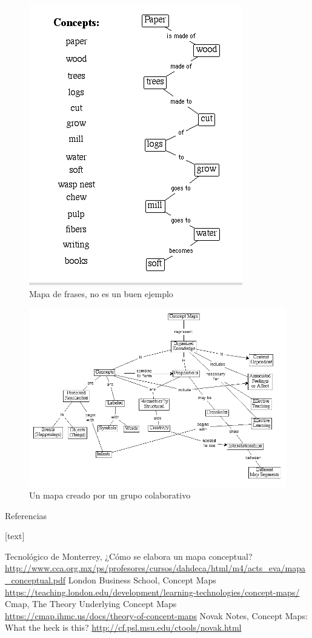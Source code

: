 \documentclass[
	11pt, %
]{beamer}
\begin{document}
\begin{frame}
  \begin{figure}[h]
    \includegraphics[width=0.5\linewidth]{paper.png}
    \caption{Mapa de frases, no es un buen ejemplo}
    \centering
  \end{figure}
\end{frame}

\begin{frame}
  \begin{figure}[h]
    \includegraphics[width=0.9\linewidth]{cmap.png}
    \caption{Un mapa creado por un grupo colaborativo}
    \centering
  \end{figure}
\end{frame}

\begin{frame}{Referencias}
  \begin{thebibliography}{10}
    [text]
    
    Tecnológico de Monterrey, ¿Cómo se elabora un mapa conceptual? \url{http://www.cca.org.mx/ps/profesores/cursos/dahdeca/html/m4/acts_eva/mapa_conceptual.pdf}
    London Business School, Concept Maps \url{https://teaching.london.edu/development/learning-technologies/concept-maps/}
    Cmap, The Theory Underlying Concept Maps \url{https://cmap.ihmc.us/docs/theory-of-concept-maps}
    Novak Notes, Concept Maps: What the heck is this? \url{http://cf.psl.msu.edu/ctools/novak.html}
  \end{thebibliography}
\end{frame}
\end{document}
